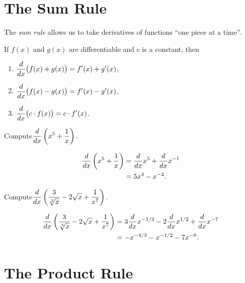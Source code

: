 \section{The Sum Rule}

The \textit{sum rule} allows us to take derivatives of functions ``one piece at a time''.

\begin{theorem}\label{theorem:sum rule}
If $f(x)$ and $g(x)$ are differentiable and $c$ is a constant, then 
\begin{enumerate}
    \item\label{SR:1} $\displaystyle\frac{d}{dx} \big( f(x) + g(x)\big) = f'(x) + g'(x)$,
    \item $\displaystyle\frac{d}{dx} \big( f(x) - g(x)\big) = f'(x) - g'(x)$,
    \item $\displaystyle\frac{d}{dx} \big(c\cdot f(x)\big) = c\cdot f'(x)$.
\end{enumerate}
\end{theorem}

\begin{example}
    Compute$\displaystyle\frac{d}{dx} \left( x^5+\frac{1}{x}\right).$ \cite{mooc}\\
    
    \begin{solution}
    \begin{align*}
    \displaystyle\frac{d}{dx} \left(x^5+\frac{1}{x}\right) &= \displaystyle\frac{d}{dx} x^5 + \displaystyle\frac{d}{dx} x^{-1} \\
    &=5x^4 - x^{-2}.
    \end{align*}
    \end{solution}
\end{example}
    
    \begin{example}
    Compute$\displaystyle\frac{d}{dx} \left(\frac{3}{\sqrt[3]{x}}-2\sqrt{x}+\frac{1}{x^7}\right).$ \cite{mooc}\\
    
    \begin{solution}
    \begin{align*}
    \displaystyle\frac{d}{dx} \left(\frac{3}{\sqrt[3]{x}}-2\sqrt{x}+\frac{1}{x^7}\right) &= 3\displaystyle\frac{d}{dx} x^{-1/3} -2\displaystyle\frac{d}{dx} x^{1/2}+\displaystyle\frac{d}{dx} x^{-7}\\
    &=-x^{-4/3} - x^{-1/2}-7x^{-8}.
    \end{align*}
    \end{solution}
\end{example}


\section{The Product Rule}

